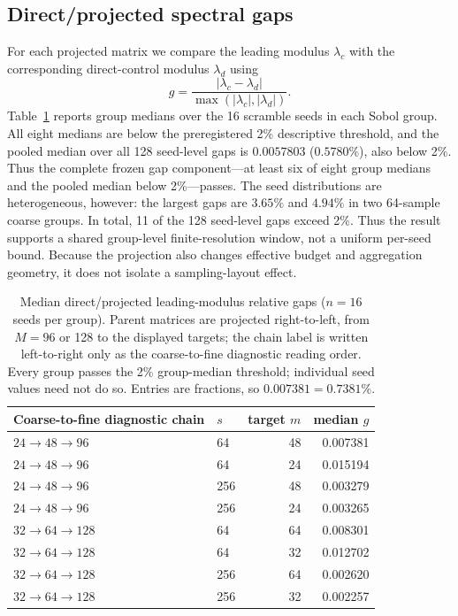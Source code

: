 \subsection{Direct/projected spectral gaps}

For each projected matrix we compare the leading modulus $\lambda_c$ with the
corresponding direct-control modulus $\lambda_d$ using
\begin{equation}
 g=\frac{|\lambda_c-\lambda_d|}{\max(|\lambda_c|,|\lambda_d|)}.
 \label{eq:gap}
\end{equation}
Table~\ref{tab:r061-gaps} reports group medians over the 16 scramble seeds in
each Sobol group.  All eight medians are below the preregistered 2\%
descriptive threshold, and the pooled median over all 128 seed-level gaps is
$0.0057803$ ($0.5780\%$), also below 2\%.  Thus the complete frozen gap
component---at least six of eight group medians and the pooled median below
2\%---passes.  The seed distributions are heterogeneous, however:
the largest gaps are $3.65\%$ and $4.94\%$ in two 64-sample coarse groups.
In total, 11 of the 128 seed-level gaps exceed 2\%.  Thus the result supports a
shared group-level finite-resolution window, not a uniform per-seed bound.
Because the projection also changes effective budget and aggregation geometry,
it does not isolate a sampling-layout effect.

\begin{table}[H]
\centering
\caption{Median direct/projected leading-modulus relative gaps ($n=16$ seeds
per group).  Parent matrices are projected right-to-left, from $M=96$ or 128
to the displayed targets; the chain label is written left-to-right only as the
coarse-to-fine diagnostic reading order.  Every group passes the 2\%
group-median threshold; individual seed values need not do so.  Entries are
fractions, so $0.007381=0.7381\%$.}
\label{tab:r061-gaps}
\small
\begin{tabular}{llrr}
\toprule
Coarse-to-fine diagnostic chain & $s$ & target $m$ & median $g$\\
\midrule
$24\to48\to96$ & 64  & 48 & 0.007381\\
$24\to48\to96$ & 64  & 24 & 0.015194\\
$24\to48\to96$ & 256 & 48 & 0.003279\\
$24\to48\to96$ & 256 & 24 & 0.003265\\
$32\to64\to128$ & 64  & 64 & 0.008301\\
$32\to64\to128$ & 64  & 32 & 0.012702\\
$32\to64\to128$ & 256 & 64 & 0.002620\\
$32\to64\to128$ & 256 & 32 & 0.002257\\
\bottomrule
\end{tabular}
\end{table}

